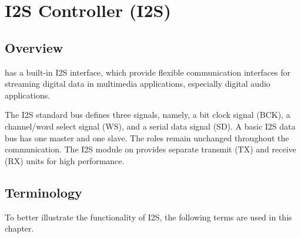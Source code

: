 \documentclass[main\_\_EN.tex]{subfiles}
\begin{document}

\ifglobal
\else
    \listoftodos
    {\let\clearpage\relax \listofdonetodos}
    \tableofcontents
\fi



\hypertarget{i2s}{}
\chapter{I2S Controller (I2S)}
\label{mod:i2s}

\section{Overview}

\chipname{} has a built-in I2S interface, which provide flexible communication interfaces for streaming digital data in multimedia applications, especially digital audio applications.

The I2S standard bus defines three signals, namely, a bit clock signal (BCK), a channel/word select signal (WS), and a serial data signal (SD). A basic I2S data bus has one master and one slave. The roles remain unchanged throughout the communication. The I2S module on \chipname{} provides separate transmit (TX) and receive (RX) units for high performance.

\section{Terminology}

To better illustrate the functionality of I2S, the following terms are used in this chapter. 
\end{document}
